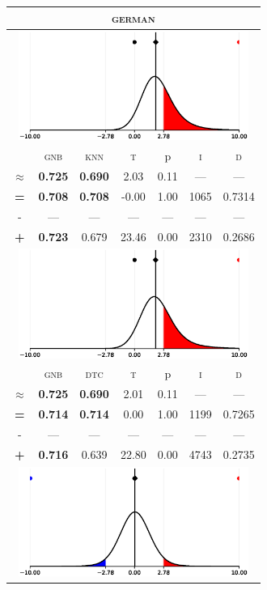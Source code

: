 \begin{tabular}{c||cc||c|c|c||c}
	\toprule
	\multicolumn{7}{c}{\textsc{german}}\\
	\bottomrule
	\multicolumn{7}{c}{\includegraphics[width=7.5cm, trim=30 0 30 0]{figures/german_0.eps}}\\

\midrule	&\textsc{gnb} & \textsc{knn} & \textsc{t} & p & \textsc{i} & \textsc{d}\\
	\color{black} $\approx$ & \color{black} \bfseries 0.725 &\color{black}  \bfseries 0.690 & 2.03 & 0.11 & --- & ---\\\midrule
	{\bfseries\color{black}\tiny=}& \color{black} \bfseries 0.708 & \color{black} \bfseries 0.708 & -0.00 & 1.00 & 1065 & \color{black} 0.7314\\
	{\tiny-}& --- & --- & --- & --- & --- & ---\\
	{\bfseries\color{red}\tiny+}& \color{red} \bfseries 0.723 & \color{red}  0.679 & 23.46 & 0.00 & 2310 & \color{red} 0.2686\\
	\bottomrule
	\multicolumn{7}{c}{\includegraphics[width=7.5cm, trim=30 0 30 0]{figures/german_1.eps}}\\

\midrule	&\textsc{gnb} & \textsc{dtc} & \textsc{t} & p & \textsc{i} & \textsc{d}\\
	\color{black} $\approx$ & \color{black} \bfseries 0.725 &\color{black}  \bfseries 0.690 & 2.01 & 0.11 & --- & ---\\\midrule
	{\bfseries\color{black}\tiny=}& \color{black} \bfseries 0.714 & \color{black} \bfseries 0.714 & 0.00 & 1.00 & 1199 & \color{black} 0.7265\\
	{\tiny-}& --- & --- & --- & --- & --- & ---\\
	{\bfseries\color{red}\tiny+}& \color{red} \bfseries 0.716 & \color{red}  0.639 & 22.80 & 0.00 & 4743 & \color{red} 0.2735\\
	\bottomrule
	\multicolumn{7}{c}{\includegraphics[width=7.5cm, trim=30 0 30 0]{figures/german_2.eps}}\\


\end{tabular}
